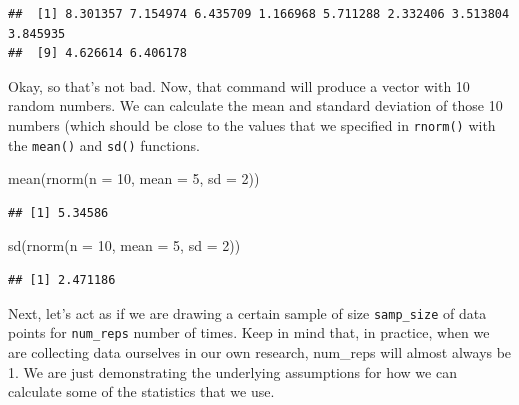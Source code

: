 \documentclass[
]{book}
\newenvironment{Shaded}{\begin{snugshade}}{\end{snugshade}}
\newcommand{\AttributeTok}[1]{\textcolor[rgb]{0.77,0.63,0.00}{#1}}
\newcommand{\DecValTok}[1]{\textcolor[rgb]{0.00,0.00,0.81}{#1}}
\newcommand{\FunctionTok}[1]{\textcolor[rgb]{0.00,0.00,0.00}{#1}}
\newcommand{\NormalTok}[1]{#1}
\begin{document}
\begin{verbatim}
##  [1] 8.301357 7.154974 6.435709 1.166968 5.711288 2.332406 3.513804 3.845935
##  [9] 4.626614 6.406178
\end{verbatim}

Okay, so that's not bad. Now, that command will produce a vector with 10 random numbers. We can calculate the mean and standard deviation of those 10 numbers (which should be close to the values that we specified in \texttt{rnorm()} with the \texttt{mean()} and \texttt{sd()} functions.

\begin{Shaded}
\begin{Highlighting}[]
\FunctionTok{mean}\NormalTok{(}\FunctionTok{rnorm}\NormalTok{(}\AttributeTok{n =} \DecValTok{10}\NormalTok{, }\AttributeTok{mean =} \DecValTok{5}\NormalTok{, }\AttributeTok{sd =} \DecValTok{2}\NormalTok{))}
\end{Highlighting}
\end{Shaded}

\begin{verbatim}
## [1] 5.34586
\end{verbatim}

\begin{Shaded}
\begin{Highlighting}[]
\FunctionTok{sd}\NormalTok{(}\FunctionTok{rnorm}\NormalTok{(}\AttributeTok{n =} \DecValTok{10}\NormalTok{, }\AttributeTok{mean =} \DecValTok{5}\NormalTok{, }\AttributeTok{sd =} \DecValTok{2}\NormalTok{))}
\end{Highlighting}
\end{Shaded}

\begin{verbatim}
## [1] 2.471186
\end{verbatim}

Next, let's act as if we are drawing a certain sample of size \texttt{samp\_size} of data points for \texttt{num\_reps} number of times. Keep in mind that, in practice, when we are collecting data ourselves in our own research, num\_reps will almost always be 1. We are just demonstrating the underlying assumptions for how we can calculate some of the statistics that we use.
\end{document}
